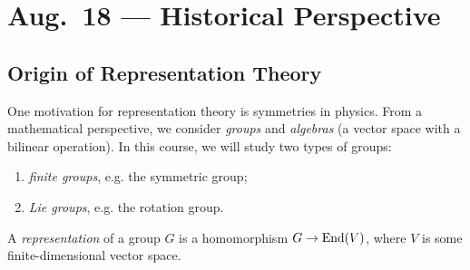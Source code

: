 \chapter{Aug.~18 --- Historical Perspective}

\section{Origin of Representation Theory}

One motivation for representation theory is
symmetries in physics.
From a mathematical perspective, we consider
\emph{groups} and \emph{algebras} (a vector
space with a bilinear operation).
In this course, we will study two types of
groups:
\begin{enumerate}
  \item \emph{finite groups}, e.g. the symmetric group;
  \item \emph{Lie groups}, e.g. the rotation group.
\end{enumerate}

\begin{definition}
  A \emph{representation} of a group $G$
  is a homomorphism $G \to \operatorname{End}(V)$, where
  $V$ is some finite-dimensional vector space.
\end{definition}


